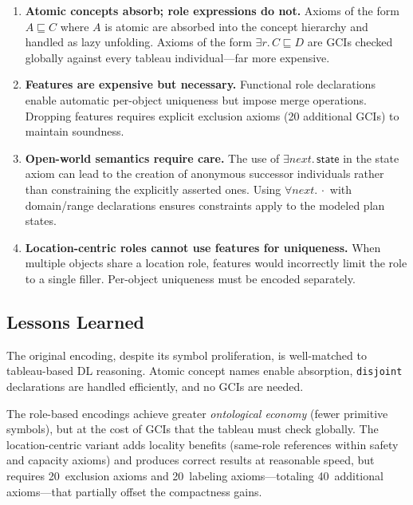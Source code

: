 \documentclass[11pt,a4paper]{article}
\newcommand{\DLsome}[2]{\exists #1.\,#2}
\newcommand{\DLall}[2]{\forall #1.\,#2}
\newcommand{\DLsub}{\sqsubseteq}
\newcommand{\concept}[1]{\ensuremath{\mathsf{#1}}}
\newcommand{\role}[1]{\ensuremath{\mathit{#1}}}
\begin{document}
\begin{enumerate}[nosep]
\item \textbf{Atomic concepts absorb; role expressions do not.}
  Axioms of the form $A \DLsub C$ where $A$ is atomic are absorbed
  into the concept hierarchy and handled as lazy unfolding.  Axioms
  of the form $\DLsome{\role{r}}{C} \DLsub D$ are GCIs checked
  globally against every tableau individual---far more expensive.

\item \textbf{Features are expensive but necessary.}
  Functional role declarations enable automatic per-object
  uniqueness but impose merge operations.  Dropping features
  requires explicit exclusion axioms (20 additional GCIs) to
  maintain soundness.

\item \textbf{Open-world semantics require care.}
  The use of $\DLsome{\role{next}}{\concept{state}}$ in the state
  axiom can lead to the creation of anonymous successor individuals
  rather than constraining the explicitly asserted ones.  Using
  $\DLall{\role{next}}{\cdot}$ with domain/range declarations
  ensures constraints apply to the modeled plan states.

\item \textbf{Location-centric roles cannot use features for
  uniqueness.}
  When multiple objects share a location role, features would
  incorrectly limit the role to a single filler.  Per-object
  uniqueness must be encoded separately.
\end{enumerate}

\subsection{Lessons Learned}

The original encoding, despite its symbol proliferation, is
well-matched to tableau-based DL reasoning.  Atomic concept names
enable absorption, \texttt{disjoint} declarations are handled
efficiently, and no GCIs are needed.

The role-based encodings achieve greater \emph{ontological economy}
(fewer primitive symbols), but at the cost of GCIs that the tableau must
check globally.  The location-centric variant adds locality benefits
(same-role references within safety and capacity axioms) and produces
correct results at reasonable speed, but requires 20~exclusion axioms
and 20~labeling axioms---totaling 40~additional axioms---that partially
offset the compactness gains.
\end{document}
